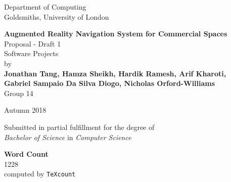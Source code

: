 \documentclass[12pt]{report}
\newcommand\blankpage{%
    \null
    \thispagestyle{empty}%
    \addtocounter{page}{-1}%
    \newpage}
\begin{document}
\begin{titlepage}
    \begin{center}
         \vspace*{1cm}
        Department of Computing\\
        Goldsmiths, University of London\\
        
        \vspace*{3.75cm}
        
        \textbf{\Large Augmented Reality Navigation System for Commercial Spaces}\\
        \vspace*{0.25cm}           
        Proposal - Draft 1\\
        Software Projects\\  
    
        \vspace*{2cm}
        by\\
        \vspace*{0.25cm}    
        \textbf{Jonathan Tang, Hamza Sheikh, Hardik Ramesh, Arif Kharoti,\\}
        \textbf{Gabriel Sampaio Da Silva Diogo, Nicholas Orford-Williams}\\
        \vspace*{0.1cm}    
        Group 14

        \vspace{2cm}
        
        Autumn 2018
        \vfill
        
        Submitted in partial fulfillment for the degree of\\
        \textit{Bachelor of Science} in \textit{Computer Science}
        
        \vspace{1.5cm}
        
    \end{center}
\end{titlepage}
\afterpage{\blankpage}
\thispagestyle{plain}

\begin{center}    
	\large
    \textbf{Word Count}\\
    1228\\
    computed by \texttt{TeXcount}
\end{center}
\end{document}

